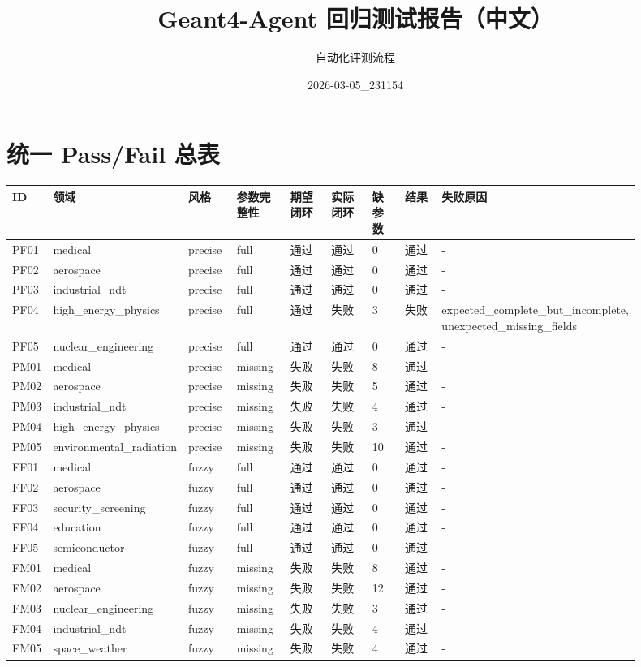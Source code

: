 \documentclass[11pt]{ctexart}
\title{Geant4-Agent 回归测试报告（中文）}
\author{自动化评测流程}
\date{2026-03-05\_231154}
\begin{document}
\maketitle
\section{统一 Pass/Fail 总表}
\begin{longtable}{p{0.06\linewidth}p{0.1\linewidth}p{0.08\linewidth}p{0.09\linewidth}p{0.08\linewidth}p{0.08\linewidth}p{0.06\linewidth}p{0.07\linewidth}p{0.28\linewidth}}
\toprule
ID & 领域 & 风格 & 参数完整性 & 期望闭环 & 实际闭环 & 缺参数 & 结果 & 失败原因 \\
\midrule
PF01 & medical & precise & full & 通过 & 通过 & 0 & 通过 & - \\
PF02 & aerospace & precise & full & 通过 & 通过 & 0 & 通过 & - \\
PF03 & industrial\_ndt & precise & full & 通过 & 通过 & 0 & 通过 & - \\
PF04 & high\_energy\_physics & precise & full & 通过 & 失败 & 3 & 失败 & expected\_complete\_but\_incomplete, unexpected\_missing\_fields \\
PF05 & nuclear\_engineering & precise & full & 通过 & 通过 & 0 & 通过 & - \\
PM01 & medical & precise & missing & 失败 & 失败 & 8 & 通过 & - \\
PM02 & aerospace & precise & missing & 失败 & 失败 & 5 & 通过 & - \\
PM03 & industrial\_ndt & precise & missing & 失败 & 失败 & 4 & 通过 & - \\
PM04 & high\_energy\_physics & precise & missing & 失败 & 失败 & 3 & 通过 & - \\
PM05 & environmental\_radiation & precise & missing & 失败 & 失败 & 10 & 通过 & - \\
FF01 & medical & fuzzy & full & 通过 & 通过 & 0 & 通过 & - \\
FF02 & aerospace & fuzzy & full & 通过 & 通过 & 0 & 通过 & - \\
FF03 & security\_screening & fuzzy & full & 通过 & 通过 & 0 & 通过 & - \\
FF04 & education & fuzzy & full & 通过 & 通过 & 0 & 通过 & - \\
FF05 & semiconductor & fuzzy & full & 通过 & 通过 & 0 & 通过 & - \\
FM01 & medical & fuzzy & missing & 失败 & 失败 & 8 & 通过 & - \\
FM02 & aerospace & fuzzy & missing & 失败 & 失败 & 12 & 通过 & - \\
FM03 & nuclear\_engineering & fuzzy & missing & 失败 & 失败 & 3 & 通过 & - \\
FM04 & industrial\_ndt & fuzzy & missing & 失败 & 失败 & 4 & 通过 & - \\
FM05 & space\_weather & fuzzy & missing & 失败 & 失败 & 4 & 通过 & - \\
\bottomrule
\end{longtable}
\end{document}
